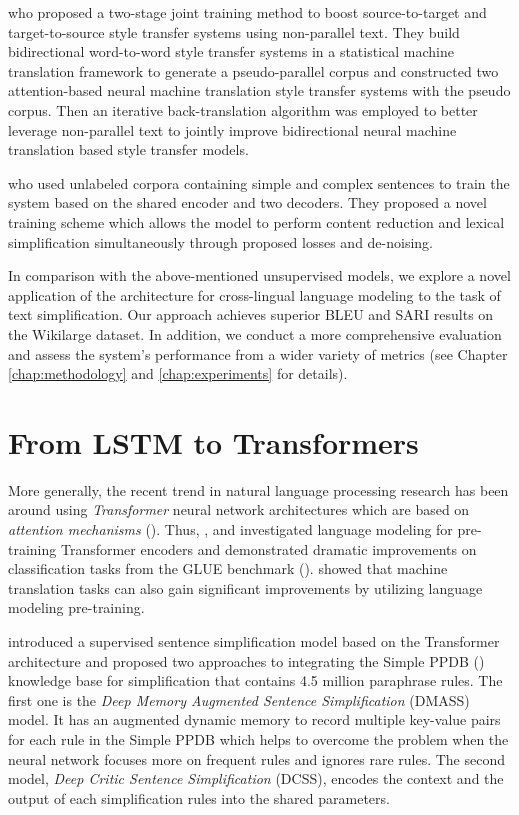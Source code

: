 \cite{Zhang2018StyleTA} who proposed a two-stage joint training method to boost source-to-target and target-to-source style transfer systems using non-parallel text. They build bidirectional word-to-word style transfer systems in a statistical machine translation framework to generate a pseudo-parallel corpus and constructed two attention-based neural machine translation style transfer systems with the pseudo corpus. Then an iterative back-translation algorithm was employed to better leverage non-parallel text to jointly improve bidirectional neural machine translation based style transfer models.

\cite{surya-etal-2019-unsupervised} who used unlabeled corpora containing simple and complex sentences to train the system based on the shared encoder and two decoders. They proposed a novel training scheme which allows the model to perform content reduction and lexical simplification simultaneously through proposed losses and de-noising.

In comparison with the above-mentioned unsupervised models, we explore a novel application of the architecture for cross-lingual language modeling to the task of text simplification. Our approach achieves superior BLEU and SARI results on the Wikilarge dataset. In addition, we conduct a more comprehensive evaluation and assess the system's performance from a wider variety of metrics (see Chapter \ref{chap:methodology} and \ref{chap:experiments} for details).


\section{From LSTM to Transformers}
\label{sec:from_lstm_to_transformers}

More generally, the recent trend in natural language processing research has been around using \emph{Transformer} neural network architectures which are based on \emph{attention mechanisms} (\cite{NIPS2017_7181}). Thus, \cite{Radford2018}, \cite{howard-ruder-2018-universal} and \cite{Devlin2019BERTPO} investigated language modeling for pre-training Transformer encoders and demonstrated dramatic improvements on classification tasks from the GLUE benchmark (\cite{wang-etal-2018-glue}). \cite{ramachandran-etal-2017-unsupervised} showed that machine translation tasks can also gain significant improvements by utilizing language modeling pre-training.

\cite{zhao2018integrating} introduced a supervised sentence simplification model based on the Transformer architecture and proposed two approaches to integrating the Simple PPDB (\cite{pavlick-callison-burch-2016-simple}) knowledge base for simplification that contains 4.5 million paraphrase rules. The first one is the \emph{Deep Memory Augmented Sentence Simplification} (DMASS) model. It has an augmented dynamic memory to record multiple key-value pairs for each rule in the Simple PPDB which helps to overcome the problem when the neural network focuses more on frequent rules and ignores rare rules. The second model, \emph{Deep Critic Sentence Simplification} (DCSS), encodes the context and the output of each simplification rules into the shared parameters. 

